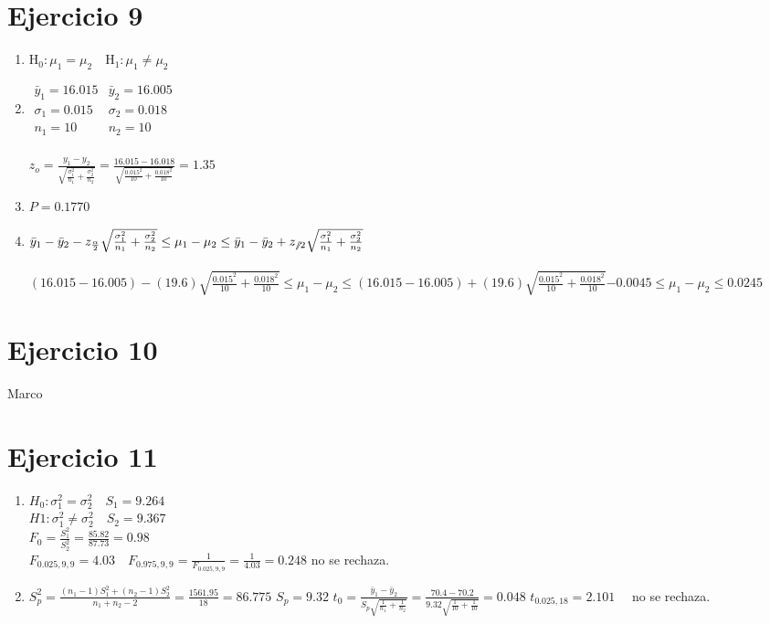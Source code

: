 \documentclass[12pt,a4paper,table]{article}
\begin{document}
\section*{Ejercicio 9}
\begin{enumerate}[label=(\alph*)]
    \item
    		$\mathrm{H}_{0}:\mu_{1}=\mu_{2} \quad \mathrm{H}_{1}:\mu_{1} \neq \mu_{2}$
    \item
    		$\begin{array}{ll}
\bar{y}_{1}=16.015 & \bar{y}_{2}=16.005 \\
\sigma_{1}=0.015 & \sigma_{2}=0.018 \\
n_{1}=10 & n_{2}=10
\end{array}$\\\\
$z_{o}=\frac{y_{1}-y_{2}}{\sqrt{\frac{\sigma_{1}^{2}}{n_{1}}+\frac{\sigma_{2}^{2}}{n_{2}}}}=\frac{16.015-16.018}{\sqrt{\frac{0.015^{2}}{10}+\frac{0.018^{2}}{10}}}=1.35$
	\item
		$P=0.1770$
	\item
	$\bar{y}_{1}-\bar{y}_{2}-z_{\frac{\alpha}{2}} \sqrt{\frac{\sigma_{1}^{2}}{n_{1}}+\frac{\sigma_{2}^{2}}{n_{2}}} \leq \mu_{1}-\mu_{2} \leq \bar{y}_{1}-\bar{y}_{2}+z_{\not / 2} \sqrt{\frac{\sigma_{1}^{2}}{n_{1}}+\frac{\sigma_{2}^{2}}{n_{2}}}$\\\\
$(16.015-16.005)-(19.6) \sqrt{\frac{0.015^{2}}{10}+\frac{0.018^{2}}{10}} \leq \mu_{1}-\mu_{2} \leq(16.015-16.005)+(19.6) \sqrt{\frac{0.015^{2}}{10}+\frac{0.018^{2}}{10}}{-0.0045 \leq \mu_{1}-\mu_{2} \leq 0.0245}$
\end{enumerate}

\section*{Ejercicio 10}
Marco

\section*{Ejercicio 11}
\begin{enumerate}[label=(\alph*)]
    \item
    $H_{0}: \sigma_{1}^{2} =\sigma_{2}^{2} \quad S_{1}=9.264$\\ $H 1: \sigma_{1}^{2} \neq \sigma_{2}^{2} \quad S_{2}=9.367$\\ $F_{0} =\frac{S_{1}^{2}}{S_{2}^{2}} =\frac{85.82}{87.73} =0.98$\\
$F_{0.025,9,9}=4.03 \quad F_{0.975,9,9}=\frac{1}{F_{0.025,9,9}}=\frac{1}{4.03}=0.248$ no se rechaza. 
    \item
    		$S_{p}^{2}=\frac{\left(n_{1}-1\right) S_{1}^{2}+\left(n_{2}-1\right) S_{2}^{2}}{n_{1}+n_{2}-2}=\frac{1561.95}{18}=86.775$
$S_{p}=9.32$
$t_{0}=\frac{\bar{y}_{1}-\bar{y}_{2}}{S_{p} \sqrt{\frac{1}{n_{1}}+\frac{1}{n_{2}}}}=\frac{70.4-70.2}{9.32 \sqrt{\frac{1}{10}+\frac{1}{10}}}=0.048$
$t_{0.025,18}=2.101 \quad$ no se rechaza.
\end{enumerate}
\end{document}
